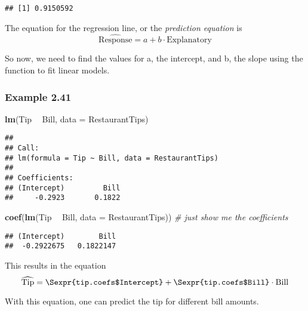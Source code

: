 \documentclass[]{book}
\newenvironment{Shaded}{\begin{snugshade}}{\end{snugshade}}
\newcommand{\CommentTok}[1]{\textcolor[rgb]{0.56,0.35,0.01}{\textit{#1}}}
\newcommand{\DataTypeTok}[1]{\textcolor[rgb]{0.13,0.29,0.53}{#1}}
\newcommand{\FloatTok}[1]{\textcolor[rgb]{0.00,0.00,0.81}{#1}}
\newcommand{\KeywordTok}[1]{\textcolor[rgb]{0.13,0.29,0.53}{\textbf{#1}}}
\newcommand{\NormalTok}[1]{#1}
\newcommand{\OperatorTok}[1]{\textcolor[rgb]{0.81,0.36,0.00}{\textbf{#1}}}
\newcommand{\StringTok}[1]{\textcolor[rgb]{0.31,0.60,0.02}{#1}}
\begin{document}
\begin{verbatim}
## [1] 0.9150592
\end{verbatim}

The equation for the regression line, or the \emph{prediction equation} is
\[
\widehat{\mbox{Response}} = a + b \cdot \mbox{Explanatory}
\]

So now, we need to find the values for a, the intercept, and b, the slope using the function to fit linear models.

\hypertarget{example-2.41}{%
\subsubsection{Example 2.41}\label{example-2.41}}

\begin{Shaded}
\begin{Highlighting}[]
\KeywordTok{lm}\NormalTok{(Tip }\OperatorTok{~}\StringTok{ }\NormalTok{Bill, }\DataTypeTok{data =}\NormalTok{ RestaurantTips)}
\end{Highlighting}
\end{Shaded}

\begin{verbatim}
## 
## Call:
## lm(formula = Tip ~ Bill, data = RestaurantTips)
## 
## Coefficients:
## (Intercept)         Bill  
##     -0.2923       0.1822
\end{verbatim}

\begin{Shaded}
\begin{Highlighting}[]
\KeywordTok{coef}\NormalTok{(}\KeywordTok{lm}\NormalTok{(Tip }\OperatorTok{~}\StringTok{ }\NormalTok{Bill, }\DataTypeTok{data =}\NormalTok{ RestaurantTips))  }\CommentTok{# just show me the coefficients}
\end{Highlighting}
\end{Shaded}

\begin{verbatim}
## (Intercept)        Bill 
##  -0.2922675   0.1822147
\end{verbatim}

This results in the equation
\[
\widehat{\mbox{Tip}} = \Sexpr{tip.coefs$Intercept} + \Sexpr{tip.coefs$Bill} \cdot \mbox{Bill}
\]

With this equation, one can predict the tip for different bill amounts.

\begin{Shaded}
\end{Shaded}
\end{document}
